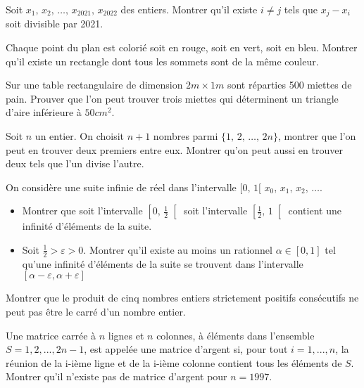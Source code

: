 \begin{exo}
Soit $x_1, \, x_2, \, \ldots, \, x_{2021}, \, x_{2022}$ des entiers. Montrer qu'il existe $i \ne j$ tels que $x_j - x_i$ soit divisible par 2021.
\end{exo}

\begin{exo}[USAMTS 2018]
Chaque point du plan est colorié soit en rouge, soit en vert, soit en bleu. Montrer qu'il existe un rectangle dont tous les sommets sont de la même couleur.
\end{exo}

\begin{exo}
Sur une table rectangulaire de dimension $2m \times 1m$ sont réparties 500 miettes de pain. Prouver que l'on peut trouver trois miettes qui déterminent un triangle d'aire inférieure à $50cm^2$.
\end{exo}

\begin{exo}
Soit $n$ un entier. On choisit $n+1$ nombres parmi $\{1, \, 2, \, \ldots , \, 2n\}$, montrer que l’on peut en trouver deux premiers entre eux. Montrer qu’on peut aussi en trouver deux tels que l’un divise l’autre.
\end{exo}

\begin{exo}
On considère une suite infinie de réel dans l'intervalle $[0, \, 1[$ $x_0, \, x_1, \, x_2, \, \ldots$.
\begin{itemize}
\item Montrer que soit l'intervalle $\left[0, \, \frac{1}{2}\right[$ soit l'intervalle $\left[\frac{1}{2}, \, 1\right[$ contient une infinité d'éléments de la suite.
\item Soit $\frac12>\varepsilon>0$. Montrer qu'il existe au moins un rationnel $\alpha\in[0,1]$ tel qu'une infinité d'éléments de la suite se trouvent dans l'intervalle $[\alpha-\varepsilon,\alpha+\varepsilon]$
\end{itemize}
\end{exo}

\begin{exo}
Montrer que le produit de cinq nombres entiers strictement positifs consécutifs ne peut pas être le carré d’un nombre entier.
\end{exo}

\begin{exo}[IMO 1997]
Une matrice carrée à $n$ lignes et $n$ colonnes, à éléments dans
l'ensemble $S = {1, 2, . . . , 2n - 1}$, est appelée une matrice d'argent si, pour tout $i =1, . . . , n$, la réunion de la i-ième ligne et de la i-ième colonne contient tous les éléments de $S$. Montrer qu'il n'existe pas de matrice d'argent pour $n = 1997$.
\end{exo}

